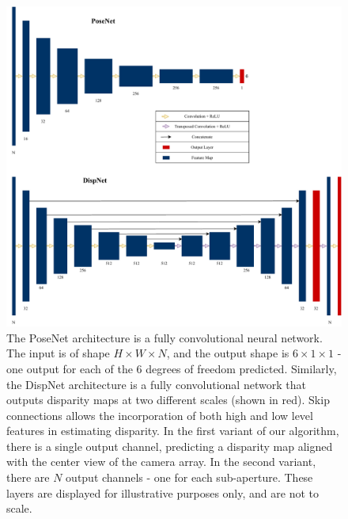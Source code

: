 \begin{figure}
    \includegraphics[width=\textwidth]{images/archs/unifiedarch.pdf}
    \caption[The PoseNet and DispNet convolutional architectures]{The PoseNet architecture is a fully convolutional neural network. The input is of shape $H \times W \times N$, and the output shape is $6 \times 1 \times 1$ - one output for each of the 6 degrees of freedom predicted. Similarly, the DispNet architecture is a fully convolutional network that outputs disparity maps at two different scales (shown in red). Skip connections allows the incorporation of both high and low level features in estimating disparity. In the first variant of our algorithm, there is a single output channel, predicting a disparity map aligned with the center view of the camera array. In the second variant, there are $N$ output channels - one for each sub-aperture. These layers are displayed for illustrative purposes only, and are not to scale. }
\end{figure}


